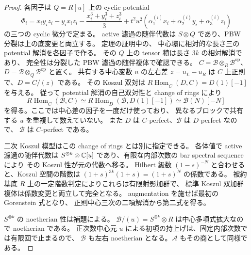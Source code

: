 \begin{proof}
各因子は $Q=R[u]$ 上の cyclic potential
\[
 \Phi_i=x_iy_iz_i-y_ix_iz_i
       -\frac{x_i^3+y_i^3+z_i^3}{3}
       +t^2u^2\left(\alpha^{(i)}_1x_i+
                     \alpha^{(i)}_2y_i+\alpha^{(i)}_3z_i\right)
\]
の三つの cyclic 微分で定まる。
active 濾過の随伴代数は $S\otimes Q$ であり、PBW 分裂は上の底変更と両立する。
定理の証明中の、
中心環に相対的な長さ三の potential 解消を各因子で作る。
その $Q$ 上の tensor 積は長さ $3k$ の相対解消であり、
完全性は分裂した PBW 濾過の随伴複体で確認できる。
$C=\mathscr B\otimes_R\mathscr B^{\mathrm{op}}$、
$D=\mathscr B\otimes_Q\mathscr B^{\mathrm{op}}$ と置く。
共有する中心変数 $u$ の左右差 $z=u_L-u_R$ は $C$ 上正則で、$D=C/(z)$ である。
その Koszul 双対は
$R\underline{\operatorname{Hom}}_C(D,C)=D(1)[-1]$ を与える。
従って potential 解消の自己双対性と change of rings により
\[
 R\underline{\operatorname{Hom}}_C(\mathscr B,C)
 \simeq R\underline{\operatorname{Hom}}_D
              (\mathscr B,D(1)[-1])
 \simeq\mathscr B(N)[-N]
\]
を得る。ここでは中心差の因子を一度だけ使っており、
異なるブロックで共有する $u$ を重複して数えていない。
また $D$ は $C$-perfect、$\mathscr B$ は $D$-perfect なので、
$\mathscr B$ は $C$-perfect である。

二次 Koszul 模型はこの change of rings とは別に指定できる。
各体値で active 濾過の随伴代数は
$S^{\otimes k}\otimes\mathbb C[u]$ であり、有限な内部次数の bar spectral sequence により
その Koszul 性が元の代数へ移る。
Hilbert 級数 $(1-s)^{-N}$ と合わせると、Koszul 空間の階数は
$(1+s)^{3k}(1+s)=(1+s)^N$ の係数である。
被約基底 $R$ 上の一定階数判定によりこれらは有限射影加群で、
標準 Koszul 双加群複体は係数変更と両立して完全となる。
augmentation を施せば最初の Gorenstein 式となり、
正則中心三次の二項解消から第二式を得る。

$S^{\otimes k}$ の noetherian 性は補題による。
$\mathscr B/(u)=S^{\otimes k}\otimes R$ は中心多項式拡大なので noetherian である。
正次数中心元 $u$ による初項の持上げは、固定内部次数では有限回で止まるので、
$\mathscr B$ も左右 noetherian となる。$\mathscr A$ もその商として同様である。


\end{proof}
